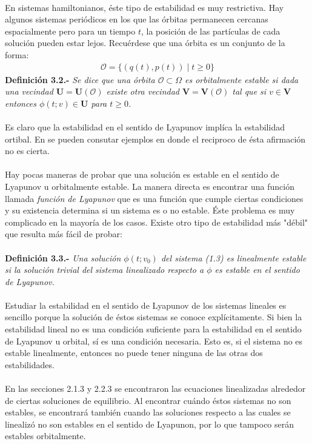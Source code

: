 \\
En sistemas hamiltonianos, éste tipo de estabilidad es muy restrictiva. Hay algunos sistemas periódicos en los que las órbitas permanecen cercanas espacialmente pero para un tiempo $t$, la posición de las partículas de cada solución pueden estar lejos. Recuérdese que una órbita es un conjunto de la forma:
\begin{eqnarray*}
\mathcal{O}=\lbrace  (q(t),p(t)) \mid t \geq 0 \rbrace
\end{eqnarray*}
\textbf{Definición 3.2.-} \textit{Se dice que una órbita $\mathcal{O} \subset \Omega$ es orbitalmente estable si dada una vecindad $\mathbf{U}=\mathbf{U}(\mathcal{O})$ existe otra vecindad $\mathbf{V}=\mathbf{V}(\mathcal{O})$  tal que si $v\in \mathbf{V}$ entonces $\phi(t;v) \in \mathbf{U}$ para $t \geq 0$.}
\\
\\
Es claro que la estabilidad en el sentido de Lyapunov implíca la estabilidad ortibal. En \citep{ortega} se pueden consutar ejemplos en donde el reciproco de ésta afirmación no es cierta.
\\
\\
Hay pocas maneras de probar que una solución es estable en el sentido de Lyapunov u orbitalmente estable. La manera directa es encontrar una función llamada \emph{función de Lyapunov} que es una función que cumple ciertas condiciones y su existencia determina si un sistema es o no estable. Éste problema es muy complicado en la mayoría de los casos. Existe otro tipo de estabilidad más "débil" que resulta más fácil de probar:
\\
\\
\textbf{Definición 3.3.-} \textit{Una solución $\phi(t;v_{0})$ del sistema (1.3) es linealmente estable si la solución trivial del sistema linealizado respecto a $\phi$ es estable en el sentido de Lyapunov.}
\\
\\
Estudiar la estabilidad en el sentido de Lyapunov de los sistemas lineales es sencillo porque la solución de éstos sistemas se conoce explícitamente. Si bien la estabilidad lineal no es una condición suficiente para la estabilidad en el sentido de Lyapunov u orbital, sí es una condición necesaria. Esto es, si el sistema no es estable linealmente, entonces no puede tener ninguna de las otras dos estabilidades.
\\
\\
En las secciones 2.1.3 y 2.2.3 se encontraron las ecuaciones linealizadas alrededor de ciertas soluciones de equilibrio. Al encontrar cuándo éstos sistemas no son estables, se encontrará también cuando las soluciones respecto a las cuales se linealizó no son estables en el sentido de Lyapunon, por lo que tampoco serán estables orbitalmente.
